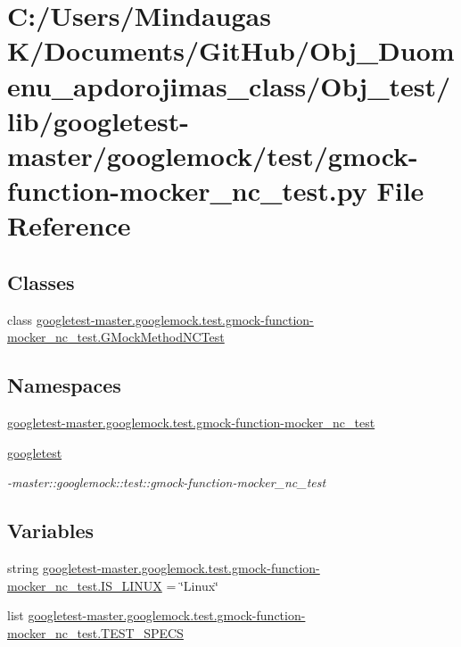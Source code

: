 \hypertarget{_obj__test_2lib_2googletest-master_2googlemock_2test_2gmock-function-mocker__nc__test_8py}{}\section{C\+:/\+Users/\+Mindaugas K/\+Documents/\+Git\+Hub/\+Obj\+\_\+\+Duomenu\+\_\+apdorojimas\+\_\+class/\+Obj\+\_\+test/lib/googletest-\/master/googlemock/test/gmock-\/function-\/mocker\+\_\+nc\+\_\+test.py File Reference}
\label{_obj__test_2lib_2googletest-master_2googlemock_2test_2gmock-function-mocker__nc__test_8py}
\subsection*{Classes}
\begin{DoxyCompactItemize}
\item 
class \mbox{\hyperlink{classgoogletest-master_1_1googlemock_1_1test_1_1gmock-function-mocker__nc__test_1_1_g_mock_method_n_c_test}{googletest-\/master.\+googlemock.\+test.\+gmock-\/function-\/mocker\+\_\+nc\+\_\+test.\+G\+Mock\+Method\+N\+C\+Test}}
\end{DoxyCompactItemize}
\subsection*{Namespaces}
\begin{DoxyCompactItemize}
\item 
 \mbox{\hyperlink{namespacegoogletest-master_1_1googlemock_1_1test_1_1gmock-function-mocker__nc__test}{googletest-\/master.\+googlemock.\+test.\+gmock-\/function-\/mocker\+\_\+nc\+\_\+test}}
\item 
 \mbox{\hyperlink{namespacegoogletest}{googletest}}
\begin{DoxyCompactList}\small\item\em -\/master\+::googlemock\+::test\+::gmock-\/function-\/mocker\+\_\+nc\+\_\+test \end{DoxyCompactList}\end{DoxyCompactItemize}
\subsection*{Variables}
\begin{DoxyCompactItemize}
\item 
string \mbox{\hyperlink{namespacegoogletest-master_1_1googlemock_1_1test_1_1gmock-function-mocker__nc__test_a25b6cc2ab6d75ff02baa892d2d163780}{googletest-\/master.\+googlemock.\+test.\+gmock-\/function-\/mocker\+\_\+nc\+\_\+test.\+I\+S\+\_\+\+L\+I\+N\+UX}} = \char`\"{}Linux\char`\"{}
\item 
list \mbox{\hyperlink{namespacegoogletest-master_1_1googlemock_1_1test_1_1gmock-function-mocker__nc__test_a03c84b881686afe9cebf45842d0f6184}{googletest-\/master.\+googlemock.\+test.\+gmock-\/function-\/mocker\+\_\+nc\+\_\+test.\+T\+E\+S\+T\+\_\+\+S\+P\+E\+CS}}
\end{DoxyCompactItemize}
